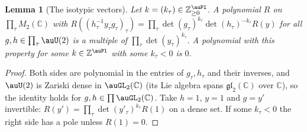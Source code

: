 \documentclass[10pt]{amsart}
\newtheorem{lemma}[theorem]{Lemma}
\theoremstyle{definition}
\theoremstyle{remark}
\newcommand{\C}{\mathbb C}
\newcommand{\Z}{\mathbb Z}
\begin{document}
\begin{lemma}[The isotypic vectors]\label{pex:iso}
Let $k=(k_\tau)\in\Z_{\ge0}^{\auPl}$. A polynomial $R$ on $\prod_\tau M_2(\C)$ with
$R((h_\tau^{-1}y_\tau g_\tau)_\tau)=\prod_\tau\det(g_\tau)^{k_\tau}\det(h_\tau)^{-k_\tau}R(y)$ for all
$g,h\in\prod_\tau\auU(2)$ is a multiple of $\prod_\tau\det(y_\tau)^{k_\tau}$. A polynomial with this
property for some $k\in\Z^{\auPl}$ with some $k_\tau<0$ is $0$.
\end{lemma}
\begin{proof}
Both sides are polynomial in the entries of $g_\tau,h_\tau$ and their inverses, and $\auU(2)$ is
Zariski dense in $\auGL_2(\C)$ (its Lie algebra spans $\mathfrak{gl}_2(\C)$ over $\C$), so the identity
holds for $g,h\in\prod\auGL_2(\C)$. Take $h=1$, $y=1$ and $g=y'$ invertible: $R(y')=\prod_\tau\det
(y'_\tau)^{k_\tau}R(1)$ on a dense set. If some $k_\tau<0$ the right side has a pole unless $R(1)=0$.
\end{proof}
\end{document}
